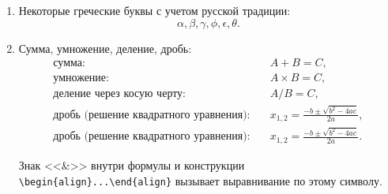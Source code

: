 \begin{enumerate}
{}%
\item Некоторые греческие буквы с учетом русской традиции:	
{\zerodisplayskips
	\begin{equation}
	\alpha,\beta,\gamma,\phi,\epsilon,\theta. \label{eq:ф5}
	\end{equation}
}%
\item Сумма, умножение, деление, дробь:
{\zerodisplayskips
	\begin{align}
	\text{сумма:}\quad & A+B=C, \label{eq:ф6}\\
	\text{умножение:}\quad & A\times B=C, \label{eq:ф7}\\
	\text{деление через косую черту:}\quad & A/B=C, \label{eq:ф8}\\
	\text{дробь (решение квадратного уравнения):}\quad & x_{1,2}=\frac{-b\pm\sqrt{b^2-4ac}}{2a}, \label{eq:ф9}\\
	\text{дробь (решение квадратного уравнения):}\quad & x_{1,2}=\frac{-b\pm\sqrt{b^2-4ac}}{2a}. \label{eq:ф99}
	\end{align}
}%

Знак <<\&>> внутри формулы и конструкции \verb=\begin{align}...\end{align}= вызывает выравнивание по этому символу. 


\end{enumerate}
